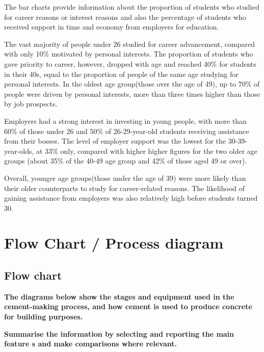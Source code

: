 \documentclass[conference]{IEEEtran}
\begin{document}
The bar charts provide information about the proportion of students who studied for career reasons or interest reasons and 
also the percentage of students who received support in time and economy from employers for education.

The vast majority of people under 26 studied for career advancement, 
compared with only 10\% motivated by personal interests.
The proportion of students who gave priority to career, however, 
dropped with age and reached 40\% for students in their 40s, equal to the proportion of people of the same age studying for personal interests.
In the oldest age group(those over the age of 49), up to 70\% of people were driven by personal interests,
more than three times higher than those by job prospects.

Employers had a strong interest in investing in young people, 
with more than 60\% of those under 26 and 50\% of 26-29-year-old students receiving assistance from their bosses.
The level of employer support was the lowest for the 30-39-year-olds, at 33\% only, 
compared with higher higher figures for the two older age groups (about 35\% of the 40-49 age group and 42\% of those aged 49 or over).

Overall, younger age groups(those under the age of 39) were more likely than their older counterparts to study for career-related reasons.
The likelihood of gaining assistance from employers was also relatively high before students turned 30.

\section{Flow Chart / Process diagram}

\subsection{Flow chart}

\textbf{The diagrams below show the stages and equipment used in the cement-making process,
and how cement is used to produce concrete for building purposes.}

\textbf{Summarise the information by selecting and reporting the main feature s and make
comparisons where relevant.}
\end{document}
